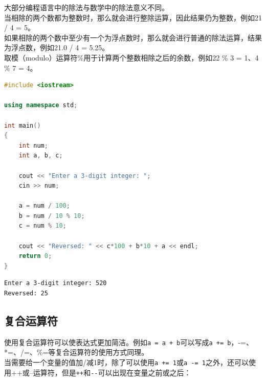 大部分编程语言中的除法与数学中的除法意义不同。\\

当相除的两个数都为整数时，那么就会进行整除运算，因此结果仍为整数，例如21 / 4 = 5。\\

如果相除的两个数中至少有一个为浮点数时，那么就会进行普通的除法运算，结果为浮点数，例如21.0 / 4 = 5.25。\\

取模（modulo）运算符\%用于计算两个整数相除之后的余数，例如22 \% 3 = 1、4 \% 7 = 4。\\


\begin{lstlisting}[language=C++]
#include <iostream>

using namespace std;

int main()
{
	int num;
	int a, b, c;

	cout << "Enter a 3-digit integer: ";
	cin >> num;

	a = num / 100;
	b = num / 10 % 10;
	c = num % 10;

	cout << "Reversed: " << c*100 + b*10 + a << endl;
	return 0;
}
\end{lstlisting}

\begin{tcolorbox}
	\begin{verbatim}
Enter a 3-digit integer: 520
Reversed: 25
	\end{verbatim}
\end{tcolorbox}

\vspace{0.5cm}

\subsection{复合运算符}

使用复合运算符可以使表达式更加简洁。例如\lstinline|a = a + b|可以写成\lstinline|a += b|，-=、*=、/=、\%=等复合运算符的使用方式同理。\\

当需要给一个变量的值加/减1时，除了可以使用\lstinline|a += 1|或\lstinline|a -= 1|之外，还可以使用++或--运算符，但是\lstinline|++|和\lstinline|--|可以出现在变量之前或之后：\\

\begin{table}[H]
	\centering
	\caption{自增/自减运算符}
\end{table}

